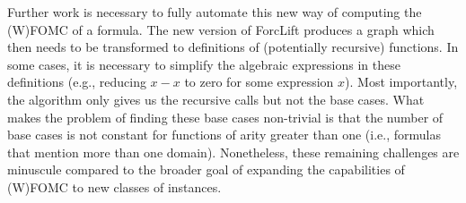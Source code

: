 \documentclass{article}
\begin{document}

Further work is necessary to fully automate this new way of computing the (W)FOMC of a formula. The new version of ForcLift produces a graph which then needs to be transformed to definitions of (potentially recursive) functions. In some cases, it is necessary to simplify the algebraic expressions in these definitions (e.g., reducing $x-x$ to zero for some expression $x$). Most importantly, the algorithm only gives us the recursive calls but not the base cases. What makes the problem of finding these base cases non-trivial is that the number of base cases is not constant for functions of arity greater than one (i.e., formulas that mention more than one domain). Nonetheless, these remaining challenges are minuscule compared to the broader goal of expanding the capabilities of (W)FOMC to new classes of instances.



\end{document}
